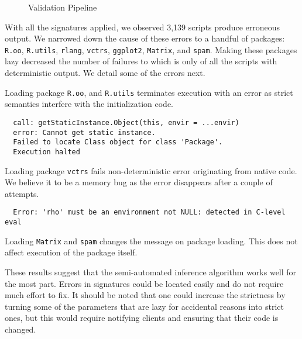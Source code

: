 \documentclass[review,screen,acmsmall]{acmart}
\newcommand{\code}[1]{\lstinline |#1|\xspace}
\begin{document}
\begin{figure}[H]
{
  }
  \caption{Validation Pipeline}\label{fig:validationPipeline}
\end{figure}


With all the signatures applied, we observed 3,139 scripts produce erroneous
output. We narrowed down the cause of these errors to a handful of packages:
\code{R.oo}, \code{R.utils}, \code{rlang}, \code{vctrs}, \code{ggplot2},
\code{Matrix}, and \code{spam}. Making these packages lazy decreased the number
of failures to \ValidationStrictFailedProgramCount which is only
\ValidationStrictFailedProgramPerc of all the scripts with deterministic output.
We detail some of the errors next.

Loading package \code{R.oo}, and \code{R.utils} terminates execution with an error as
strict semantics interfere with the initialization code.

\begin{verbatim}
  call: getStaticInstance.Object(this, envir = ...envir)
  error: Cannot get static instance.
  Failed to locate Class object for class 'Package'.
  Execution halted
\end{verbatim}

Loading package \code{vctrs} fails non-deterministic error originating from
native code. We believe it to be a memory bug as the error disappears after
a couple of attempts.

\begin{verbatim}
  Error: 'rho' must be an environment not NULL: detected in C-level eval
\end{verbatim}

Loading \code{Matrix} and \code{spam} changes the message on package loading.
This does not affect execution of the package itself.

These results suggest that the semi-automated inference algorithm works well for
the most part. Errors in signatures could be located easily and do not require
much effort to fix. It should be noted that one could increase the strictness by
turning some of the parameters that are lazy for accidental reasons into strict
ones, but this would require notifying clients and ensuring that their code is
changed.
\end{document}
